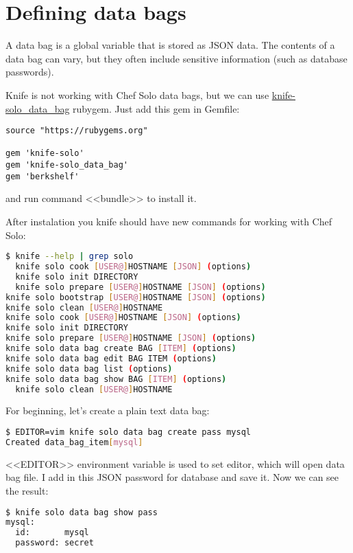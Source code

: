 \section{Defining data bags}

A data bag is a global variable that is stored as JSON data. The contents of a data bag can vary, but they often include sensitive information (such as database passwords).

Knife is not working with Chef Solo data bags, but we can use \href{http://thbishop.com/knife-solo\_data\_bag/}{knife-solo\_data\_bag} rubygem. Just add this gem in Gemfile:

\begin{lstlisting}[label=lst:my-cloud-chef-databag1,title=my-cloud/Gemfile]
source "https://rubygems.org"

gem 'knife-solo'
gem 'knife-solo_data_bag'
gem 'berkshelf'
\end{lstlisting}

and run command <<bundle>> to install it.

After instalation you knife should have new commands for working with Chef Solo:

\begin{lstlisting}[language=Bash,label=lst:my-cloud-chef-databag2]
$ knife --help | grep solo
  knife solo cook [USER@]HOSTNAME [JSON] (options)
  knife solo init DIRECTORY
  knife solo prepare [USER@]HOSTNAME [JSON] (options)
knife solo bootstrap [USER@]HOSTNAME [JSON] (options)
knife solo clean [USER@]HOSTNAME
knife solo cook [USER@]HOSTNAME [JSON] (options)
knife solo init DIRECTORY
knife solo prepare [USER@]HOSTNAME [JSON] (options)
knife solo data bag create BAG [ITEM] (options)
knife solo data bag edit BAG ITEM (options)
knife solo data bag list (options)
knife solo data bag show BAG [ITEM] (options)
  knife solo clean [USER@]HOSTNAME
\end{lstlisting}

For beginning, let's create a plain text data bag:

\begin{lstlisting}[language=Bash,label=lst:my-cloud-chef-databag3]
$ EDITOR=vim knife solo data bag create pass mysql
Created data_bag_item[mysql]
\end{lstlisting}

<<EDITOR>> environment variable is used to set editor, which will open data bag file. I add in this JSON password for database and save it. Now we can see the result:

\begin{lstlisting}[language=Bash,label=lst:my-cloud-chef-databag4]
$ knife solo data bag show pass
mysql:
  id:       mysql
  password: secret
\end{lstlisting}

